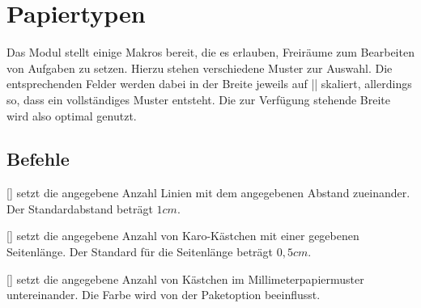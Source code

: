 \section{Papiertypen}
\label{modul:papiertypen}
Das Modul  stellt einige Makros bereit, die
es erlauben, Freiräume zum Bearbeiten von Aufgaben zu setzen. Hierzu
stehen verschiedene Muster zur Auswahl. Die entsprechenden Felder werden
dabei in der Breite jeweils auf \verbcode|\linewidth| skaliert, 
allerdings so, dass ein vollständiges Muster entsteht. Die zur Verfügung
stehende Breite wird also optimal genutzt.

\subsection{Befehle}
\begin{commands}
	[]
		setzt die angegebene Anzahl Linien mit dem angegebenen Abstand zueinander. Der Standardabstand beträgt $1cm$.
\begin{example}
\end{example}

	[]
		setzt die angegebene Anzahl von Karo-Kästchen mit einer
		gegebenen Seitenlänge. Der Standard für die Seitenlänge beträgt
		$0,5cm$.
\begin{example}
\end{example}

	[]
		setzt die angegebene Anzahl von Kästchen im
		Millimeterpapiermuster untereinander. Die Farbe wird von der
		Paketoption  beeinflusst.
\begin{example}
\end{example}
\end{commands}
